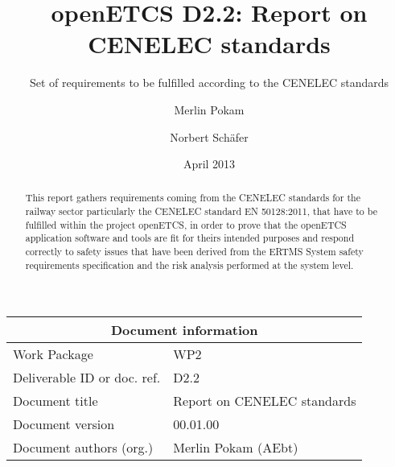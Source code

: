 \documentclass{template/openetcs_report}
\begin{document}
\frontmatter
{}




\title{openETCS D2.2: Report on CENELEC standards}

\subtitle{Set of requirements to be fulfilled according to the CENELEC standards}

\date{April 2013}

\author{Merlin Pokam \and Norbert Sch\"afer}






\begin{abstract}
This report gathers requirements coming from the CENELEC standards for the railway sector particularly the CENELEC standard EN 50128:2011, that have to be fulfilled within the project openETCS, in order to prove that the openETCS application software and tools are fit for theirs intended purposes and respond correctly to safety issues that have been derived from the ERTMS System safety requirements specification and the risk analysis performed at the system level.
\end{abstract}

\maketitle

\begin{tabular}{|p{4.4cm}|p{8.7cm}|}
\hline
\multicolumn{2}{|c|}{\textbf{Document information}} \\
\hline
Work Package &  WP2  \\
Deliverable ID or doc. ref. & D2.2\\
\hline
Document title & Report on CENELEC standards \\
Document version & 00.01.00 \\
Document authors (org.)  & Merlin Pokam (AEbt) \\
\hline
\end{tabular}
\end{document}
